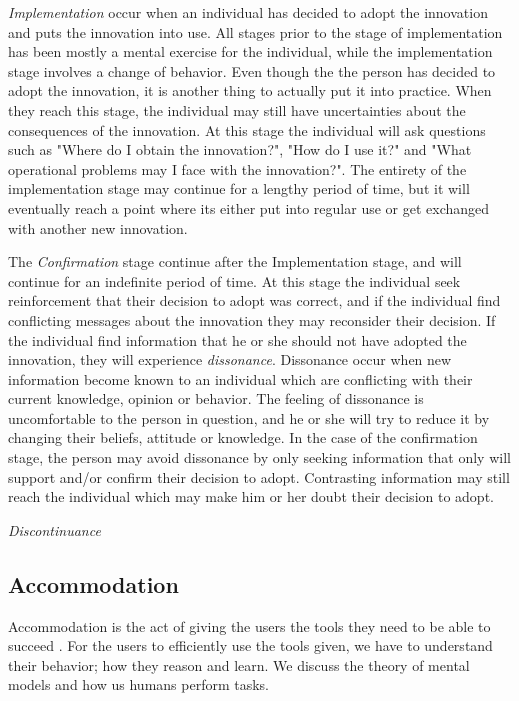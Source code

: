 \textit{Implementation} occur when an individual has decided to adopt the innovation and puts the innovation into use. All stages prior to the stage of implementation has been mostly a mental exercise for the individual, while the implementation stage involves a change of behavior. Even though the the person has decided to adopt the innovation, it is another thing to actually put it into practice. When they reach this stage, the individual may still have uncertainties about the consequences of the innovation. At this stage the individual will ask questions such as "Where do I obtain the innovation?", "How do I use it?" and "What operational problems may I face with the innovation?". The entirety of the implementation stage may continue for a lengthy period of time, but it will eventually reach a point where its either put into regular use or get exchanged with another new innovation.

The \textit{Confirmation} stage continue after the Implementation stage, and will continue for an indefinite period of time. At this stage the individual seek reinforcement that their decision to adopt was correct, and if the individual find conflicting messages about the innovation they may reconsider their decision. If the individual find information that he or she should not have adopted the innovation, they will experience \textit{dissonance}. Dissonance occur when new information become known to an individual which are conflicting with their current knowledge, opinion or behavior. The feeling of dissonance is uncomfortable to the person in question, and he or she will try to reduce it by changing their beliefs, attitude or knowledge. In the case of the confirmation stage, the person may avoid dissonance by only seeking information that only will support and/or confirm their decision to adopt. Contrasting information may still reach the individual which may make him or her doubt their decision to adopt.

\textit{Discontinuance}

\subsection{Accommodation}
Accommodation is the act of giving the users the tools they need to be able to succeed \cite{Bradt2009}. For the users to efficiently use the tools given, we have to understand their behavior; how they reason and learn. We discuss the theory of mental models and how us humans perform tasks.

